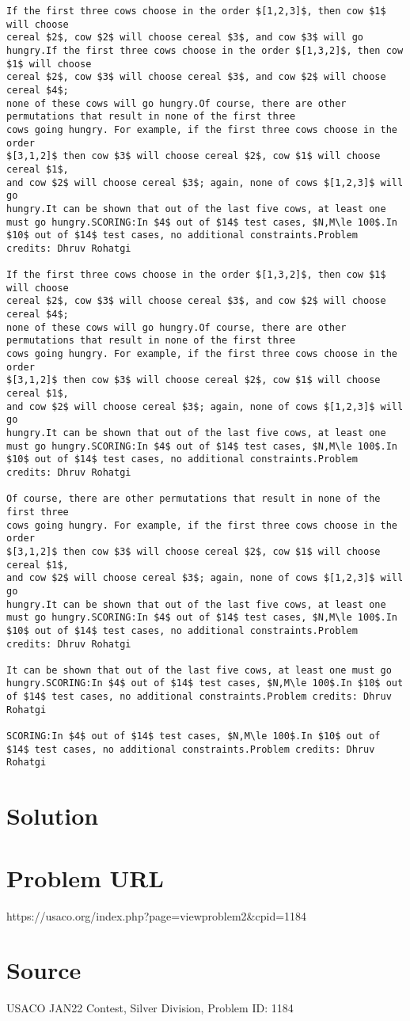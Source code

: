 \documentclass[12pt]{article}
\begin{document}
\begin{verbatim}
If the first three cows choose in the order $[1,2,3]$, then cow $1$ will choose
cereal $2$, cow $2$ will choose cereal $3$, and cow $3$ will go hungry.If the first three cows choose in the order $[1,3,2]$, then cow $1$ will choose
cereal $2$, cow $3$ will choose cereal $3$, and cow $2$ will choose cereal $4$;
none of these cows will go hungry.Of course, there are other permutations that result in none of the first three
cows going hungry. For example, if the first three cows choose in the order
$[3,1,2]$ then cow $3$ will choose cereal $2$, cow $1$ will choose cereal $1$,
and cow $2$ will choose cereal $3$; again, none of cows $[1,2,3]$ will go
hungry.It can be shown that out of the last five cows, at least one must go hungry.SCORING:In $4$ out of $14$ test cases, $N,M\le 100$.In $10$ out of $14$ test cases, no additional constraints.Problem credits: Dhruv Rohatgi

If the first three cows choose in the order $[1,3,2]$, then cow $1$ will choose
cereal $2$, cow $3$ will choose cereal $3$, and cow $2$ will choose cereal $4$;
none of these cows will go hungry.Of course, there are other permutations that result in none of the first three
cows going hungry. For example, if the first three cows choose in the order
$[3,1,2]$ then cow $3$ will choose cereal $2$, cow $1$ will choose cereal $1$,
and cow $2$ will choose cereal $3$; again, none of cows $[1,2,3]$ will go
hungry.It can be shown that out of the last five cows, at least one must go hungry.SCORING:In $4$ out of $14$ test cases, $N,M\le 100$.In $10$ out of $14$ test cases, no additional constraints.Problem credits: Dhruv Rohatgi

Of course, there are other permutations that result in none of the first three
cows going hungry. For example, if the first three cows choose in the order
$[3,1,2]$ then cow $3$ will choose cereal $2$, cow $1$ will choose cereal $1$,
and cow $2$ will choose cereal $3$; again, none of cows $[1,2,3]$ will go
hungry.It can be shown that out of the last five cows, at least one must go hungry.SCORING:In $4$ out of $14$ test cases, $N,M\le 100$.In $10$ out of $14$ test cases, no additional constraints.Problem credits: Dhruv Rohatgi

It can be shown that out of the last five cows, at least one must go hungry.SCORING:In $4$ out of $14$ test cases, $N,M\le 100$.In $10$ out of $14$ test cases, no additional constraints.Problem credits: Dhruv Rohatgi

SCORING:In $4$ out of $14$ test cases, $N,M\le 100$.In $10$ out of $14$ test cases, no additional constraints.Problem credits: Dhruv Rohatgi
\end{verbatim}

\section*{Solution}


\section*{Problem URL}
https://usaco.org/index.php?page=viewproblem2&cpid=1184

\section*{Source}
USACO JAN22 Contest, Silver Division, Problem ID: 1184
\end{document}
